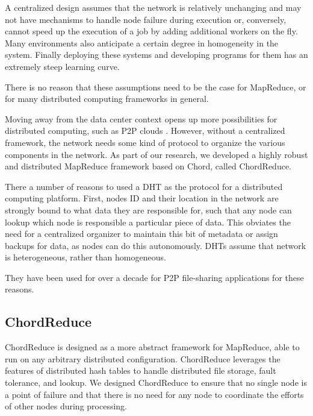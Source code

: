 A centralized design assumes that the network is relatively unchanging and may not have mechanisms to handle node failure during execution or, conversely, cannot speed up the execution of a job by adding additional workers on the fly.  
Many environments also anticipate a certain degree in homogeneity in the system.
Finally deploying these systems and developing programs for them has an extremely steep learning curve.

There is no reason that these assumptions need to be the case for MapReduce, or for many distributed computing frameworks in general.

Moving away from the data center context opens up more possibilities for distributed computing, such as P2P clouds \cite{p2p-cloud}.
However, without a centralized framework, the network needs some kind of protocol to organize the various components in the network.
As part of our research, we developed a highly robust and distributed MapReduce framework based on Chord, called ChordReduce.

There a number of reasons to used a DHT as the protocol for a distributed computing platform.
First, nodes ID and their location in the network are strongly bound to what data they are responsible for, such that any node can lookup which node is responsible a particular piece of data.
This obviates the need for a centralized organizer to maintain this bit of metadata or assign backups for data, as nodes can do this autonomously.
DHTs assume that network is heterogeneous, rather than homogeneous.

They have been used for over a decade for P2P file-sharing applications for these reasons.




\subsection{ChordReduce}


ChordReduce is designed as a more abstract framework for MapReduce, able to run on any arbitrary distributed configuration.
ChordReduce leverages the features of distributed hash tables to handle distributed file storage, fault tolerance, and lookup.  
We designed ChordReduce to ensure that no single node is a point of failure and that there is no need for any node to coordinate the efforts of other nodes during processing.



